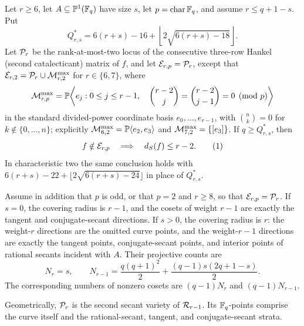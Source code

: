 \begin{theorem}
\label{thm:main}%
%
%
%
%
Let \(r\geq6\), let \(A\subseteq\mathbb P^1(\mathbb F_q)\) have size \(s\), let
\(p=\operatorname{char}\mathbb F_q\), and assume \(r\leq q+1-s\).  Put
\[
 Q^*_{r,s}=6(r+s)-16+
 \left\lfloor2\sqrt{6(r+s)-18}\right\rfloor .
\]
Let \(\mathcal P_r\) be the rank-at-most-two locus of the consecutive
three-row Hankel (second catalecticant) matrix of \(f\), and let
\(\mathcal E_{r,p}=\mathcal P_r\), except that
\(\mathcal E_{r,2}=\mathcal P_r\cup\mathcal M^{\max}_{r,2}\) for \(r\in\{6,7\}\), where
\[
 \mathcal M^{\max}_{r,p}=
 \mathbb P\!\left\langle e_j:
 0\leq j\leq r-1,\quad
 \binom{r-2}{j}=\binom{r-2}{j-1}=0\pmod p\right\rangle
\]
in the standard divided-power coordinate basis \(e_0,\ldots,e_{r-1}\), with
\(\binom nk=0\) for \(k\notin\{0,\ldots,n\}\); explicitly
\(\mathcal M^{\max}_{6,2}=\mathbb P\langle e_2,e_3\rangle\) and
\(\mathcal M^{\max}_{7,2}=\{[e_3]\}\).
If \(q\geq Q^*_{r,s}\), then
\[
 f\notin \cE_{r,p}
 \quad\Longrightarrow\quad d_S(f)\leq r-2.
 \autoeqtag{eq:main-carrier-containment}
\]
In characteristic two the same conclusion holds with
\(6(r+s)-22+\lfloor2\sqrt{6(r+s)-24}\rfloor\) in place of
\(Q^*_{r,s}\).

Assume in addition that \(p\) is odd, or that \(p=2\) and \(r\geq8\), so
that \(\mathcal E_{r,p}=\mathcal P_r\).  If \(s=0\), the covering radius is
\(r-1\), and the cosets of weight \(r-1\) are exactly the tangent and
conjugate-secant directions.  If \(s>0\), the covering radius is \(r\): the
weight-\(r\) directions are the omitted curve points, and the weight-\(r-1\)
directions are exactly the tangent points, conjugate-secant points, and
interior points of rational secants incident with \(A\).  Their projective
counts are
\[
 N_r=s,\qquad
 N_{r-1}=\frac{q(q+1)^2}{2}
       +\frac{(q-1)s(2q+1-s)}2.
\]
The corresponding numbers of nonzero cosets are \((q-1)N_r\) and
\((q-1)N_{r-1}\).
\end{theorem}

Geometrically, \(\mathcal P_r\) is the second secant variety of
\(\mathcal R_{r-1}\).  Its \(\mathbb F_q\)-points comprise the curve itself and the
rational-secant, tangent, and conjugate-secant strata.

